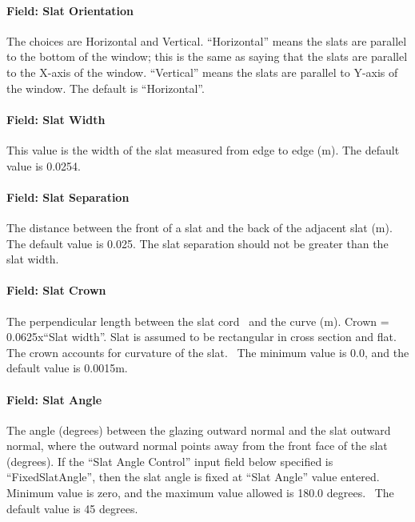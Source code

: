 \paragraph{Field: Slat Orientation}\label{field-slat-orientation-1}

The choices are Horizontal and Vertical. ``Horizontal'' means the slats are parallel to the bottom of the window; this is the same as saying that the slats are parallel to the X-axis of the window. ``Vertical'' means the slats are parallel to Y-axis of the window. The default is ``Horizontal''.

\paragraph{Field: Slat Width}\label{field-slat-width-2}

This value is the width of the slat measured from edge to edge (m). The default value is 0.0254.

\paragraph{Field: Slat Separation}\label{field-slat-separation-1}

The distance between the front of a slat and the back of the adjacent slat (m). The default value is 0.025. The slat separation should not be greater than the slat width.

\paragraph{Field: Slat Crown}\label{field-slat-crown}

The perpendicular length between the slat cord ~and the curve (m). Crown = 0.0625x``Slat width''. Slat is assumed to be rectangular in cross section and flat. The crown accounts for curvature of the slat.~ The minimum value is 0.0, and the default value is 0.0015m.

\paragraph{Field: Slat Angle}\label{field-slat-angle-2}

The angle (degrees) between the glazing outward normal and the slat outward normal, where the outward normal points away from the front face of the slat (degrees). If the ``Slat Angle Control'' input field below specified is ``FixedSlatAngle'', then the slat angle is fixed at ``Slat Angle'' value entered.~ Minimum value is zero, and the maximum value allowed is 180.0 degrees.~ The default value is 45 degrees.

